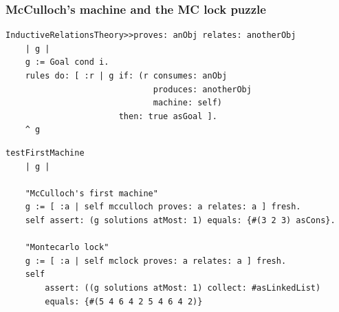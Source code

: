 \documentclass[9pt]{beamer}
\begin{document}
\begin{frame}[fragile]
\frametitle{McCulloch's machine and the MC lock puzzle}
\begin{verbatim}
InductiveRelationsTheory>>proves: anObj relates: anotherObj
    | g |
    g := Goal cond i.
    rules do: [ :r | g if: (r consumes: anObj
                              produces: anotherObj
                              machine: self)
                       then: true asGoal ].
    ^ g
\end{verbatim}
\begin{verbatim}
testFirstMachine
    | g |

    "McCulloch's first machine"
    g := [ :a | self mcculloch proves: a relates: a ] fresh.
    self assert: (g solutions atMost: 1) equals: {#(3 2 3) asCons}.

    "Montecarlo lock"
    g := [ :a | self mclock proves: a relates: a ] fresh.
    self
        assert: ((g solutions atMost: 1) collect: #asLinkedList)
        equals: {#(5 4 6 4 2 5 4 6 4 2)}
\end{verbatim}
\end{frame}
\end{document}
